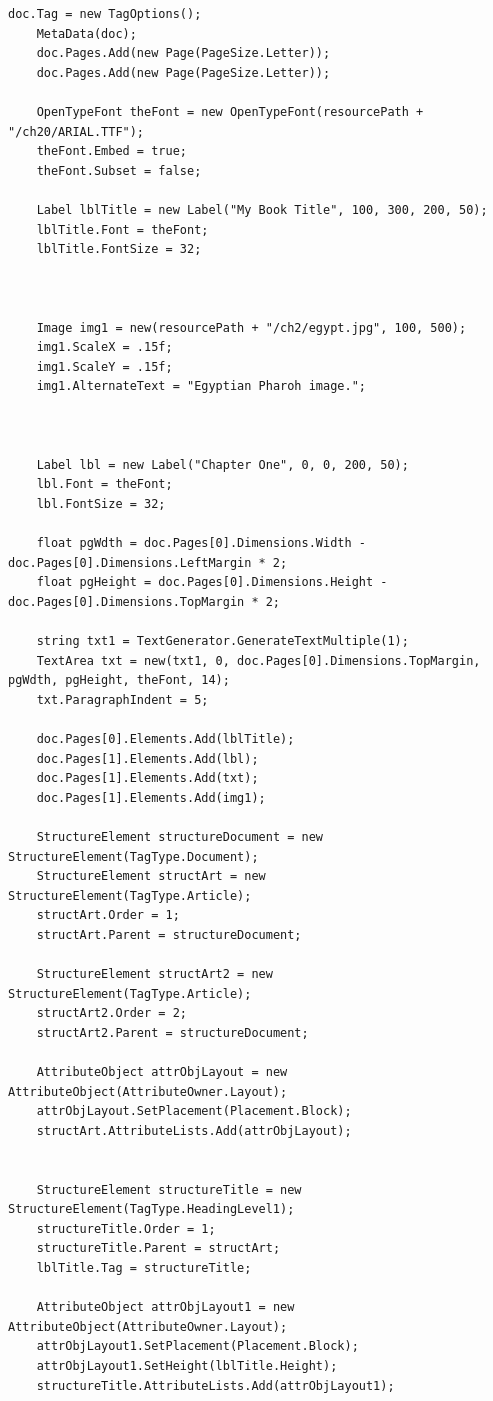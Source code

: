 \documentclass[american,letterpaper]{tufte-book}
\numberwithin{equation}{section}
\numberwithin{figure}{section}
\begin{document}
{{\begin{lstlisting}[caption={Adding attributes to a document's tags.},label={lis:Adding-attributes-to},basicstyle={\small\ttfamily},breaklines=true]
    doc.Tag = new TagOptions();
    MetaData(doc);
    doc.Pages.Add(new Page(PageSize.Letter));
    doc.Pages.Add(new Page(PageSize.Letter));

    OpenTypeFont theFont = new OpenTypeFont(resourcePath + "/ch20/ARIAL.TTF");
    theFont.Embed = true;
    theFont.Subset = false;

    Label lblTitle = new Label("My Book Title", 100, 300, 200, 50);
    lblTitle.Font = theFont;
    lblTitle.FontSize = 32;



    Image img1 = new(resourcePath + "/ch2/egypt.jpg", 100, 500);
    img1.ScaleX = .15f;
    img1.ScaleY = .15f;
    img1.AlternateText = "Egyptian Pharoh image.";

   

    Label lbl = new Label("Chapter One", 0, 0, 200, 50);
    lbl.Font = theFont;
    lbl.FontSize = 32;

    float pgWdth = doc.Pages[0].Dimensions.Width - doc.Pages[0].Dimensions.LeftMargin * 2;
    float pgHeight = doc.Pages[0].Dimensions.Height - doc.Pages[0].Dimensions.TopMargin * 2;

    string txt1 = TextGenerator.GenerateTextMultiple(1);
    TextArea txt = new(txt1, 0, doc.Pages[0].Dimensions.TopMargin, pgWdth, pgHeight, theFont, 14);
    txt.ParagraphIndent = 5;

    doc.Pages[0].Elements.Add(lblTitle);
    doc.Pages[1].Elements.Add(lbl);
    doc.Pages[1].Elements.Add(txt);
    doc.Pages[1].Elements.Add(img1);

    StructureElement structureDocument = new StructureElement(TagType.Document);
    StructureElement structArt = new StructureElement(TagType.Article);
    structArt.Order = 1;
    structArt.Parent = structureDocument;

    StructureElement structArt2 = new StructureElement(TagType.Article);
    structArt2.Order = 2;
    structArt2.Parent = structureDocument;
   
    AttributeObject attrObjLayout = new AttributeObject(AttributeOwner.Layout);
    attrObjLayout.SetPlacement(Placement.Block);
    structArt.AttributeLists.Add(attrObjLayout);


    StructureElement structureTitle = new StructureElement(TagType.HeadingLevel1);
    structureTitle.Order = 1;
    structureTitle.Parent = structArt;
    lblTitle.Tag = structureTitle;

    AttributeObject attrObjLayout1 = new AttributeObject(AttributeOwner.Layout);
    attrObjLayout1.SetPlacement(Placement.Block);
    attrObjLayout1.SetHeight(lblTitle.Height);
    structureTitle.AttributeLists.Add(attrObjLayout1);



\end{lstlisting}}}
\end{document}
